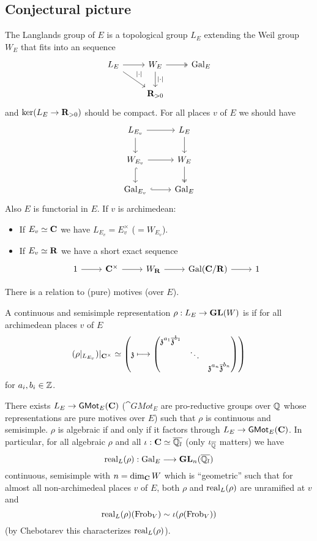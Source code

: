 \subsection{Conjectural picture}
The Langlands group of $E$ is a topological group $L_E$ extending the Weil group $W_E$ that fits into an sequence
\[
\begin{tikzcd}
	L_E \ar[dr,"|\cdot |"] \ar[r] & W_E \ar[d,"|\cdot |"] \ar[r,twoheadrightarrow] & \Gal_E \\
	 & \R_{>0}
\end{tikzcd}
\] 
and $\ker(L_E\to \R_{>0})$ should be compact. For all places $v$ of $E$ we should have
\[
\begin{tikzcd}
	L_{E_v} \ar[r] \ar[d] & L_E \ar[d] \\
	W_{E_v} \ar[r] \ar[d,hook] & W_E \ar[d,twoheadrightarrow] \\
	\Gal_{E_v} \ar[r,hook] & \Gal_E
\end{tikzcd}
\]  
Also $E$ is functorial in $E$. If $v$ is archimedean:
\begin{itemize}
	\item If $E_v\simeq \mathbf{C}$ we have $L_{E_v}=E_v^{\times }$ ($=W_{E_v}$).
	\item If $E_v\simeq \mathbf{R}$ we have a short exact sequence
		\[
		\begin{tikzcd}
			1 \ar[r] & \C^{\times } \ar[r] & W_\R \ar[r] & \Gal(\C /\R) \ar[r] & 1
		\end{tikzcd}
		\] 
\end{itemize}
There is a relation to (pure) motives (over $E$).
\begin{definition}
	A continuous and semisimple representation $\rho:L_E\to \GL(W)$ is  if for all archimedean places $v$ of $E$ 
	\[
		(\rho|_{L_{E_v}})|_{\C^{\times }} \isoto \left( \kz \mapsto \begin{pmatrix} \kz^{a_1}\overline{\kz}^{b_1} \\ & \ddots \\ & & \kz^{a_n}\overline{\kz}^{b_n} \end{pmatrix}  \right) 
	\] 
	for $a_i,b_i\in \mathbb Z$.
\end{definition}
\begin{conjecture}
	There exists $L_E\to \cat{GMot}_E(\C)$ ($\cat{GMot}_E$ are pro-reductive groups over $\mathbb Q$ whose representations are pure motives over $E$) such that $\rho$ is continuous and semisimple. $\rho$ is algebraic if and only if it factors through $L_E\to \cat{GMot}_E(\C)$. In particular, for all algebraic $\rho$ and all $\iota:\mathbf{C}\simeq \overline{\mathbb Q_l}$ (only $\iota_{\overline{\mathbb Q}}$ matters) we have
	\[
	\real_L(\rho):\Gal_E \to \GL_n(\overline{\Q_l})
	\] 
	continuous, semisimple with $n=\dim_\mathbf{C} W$ which is ``geometric'' such that for almost all non-archimedeal places $v$ of $E$, both $\rho$ and $\operatorname{real}_L(\rho)$ are unramified at $v$ and 
	\[
	\operatorname{real}_L(\rho)(\operatorname{Frob}_V) \sim \iota(\rho(\operatorname{Frob}_V))
	\] 
	(by Chebotarev this characterizes $\operatorname{real}_L(\rho)$).
\end{conjecture}


